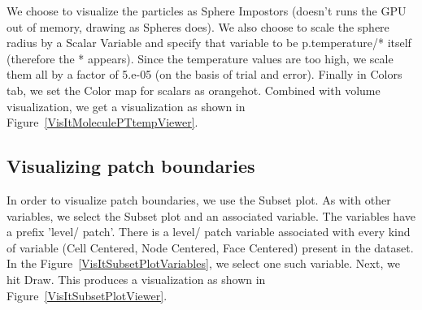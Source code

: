 
We choose to visualize the particles as Sphere Impostors (doesn't runs
the GPU out of memory, drawing as Spheres does). We also choose to
scale the sphere radius by a Scalar Variable and specify that variable
to be p.temperature/* itself (therefore the * appears). Since the
temperature values are too high, we scale them all by a factor of
5.e-05 (on the basis of trial and error). Finally in Colors tab, we
set the Color map for scalars as orangehot.  Combined with volume
visualization, we get a visualization as shown in
Figure~\ref{VisItMoleculePTtempViewer}.


\subsection{Visualizing patch boundaries}
In order to visualize patch boundaries, we use the Subset plot. As
with other variables, we select the Subset plot and an associated
variable. The variables have a prefix 'level/ patch'. There is a
level/ patch variable associated with every kind of variable (Cell
Centered, Node Centered, Face Centered) present in the dataset. In the
Figure~\ref{VisItSubsetPlotVariables}, we select one such variable.
Next, we hit Draw. This produces a visualization as shown in
Figure~\ref{VisItSubsetPlotViewer}.

